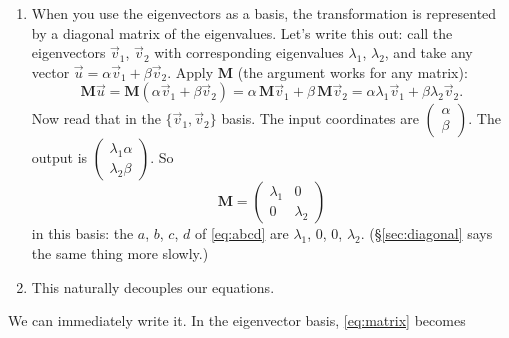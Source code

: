 \documentclass[12pt]{article}
\numberwithin{equation}{section}
\begin{document}
\begin{enumerate}
\item[1.] When you use the eigenvectors as a basis, the transformation is
  represented by a diagonal matrix of the eigenvalues. Let's write this
  out: call the eigenvectors $\vec{v}_1$, $\vec{v}_2$ with corresponding
  eigenvalues $\lambda_1$, $\lambda_2$, and take any vector $\vec{u} =
  \alpha\vec{v}_1 + \beta\vec{v}_2$. Apply $\mathbf{M}$ (the argument
  works for any matrix):
  \begin{equation*}
    \mathbf{M}\vec{u} = \mathbf{M}(\alpha\vec{v}_1 + \beta\vec{v}_2)
    = \alpha\,\mathbf{M}\vec{v}_1 + \beta\,\mathbf{M}\vec{v}_2
    = \alpha\lambda_1\vec{v}_1 + \beta\lambda_2\vec{v}_2 .
  \end{equation*}
  Now read that in the $\{\vec{v}_1, \vec{v}_2\}$ basis. The input coordinates
  are $\left(\begin{smallmatrix} \alpha \\ \beta \end{smallmatrix}\right)$. The
  output is $\left(\begin{smallmatrix} \lambda_1 \alpha \\ \lambda_2 \beta
  \end{smallmatrix}\right)$. So
  \begin{equation*}
    \mathbf{M} = \begin{pmatrix} \lambda_1 & 0 \\ 0 & \lambda_2 \end{pmatrix}
  \end{equation*}
  in this basis: the $a$, $b$, $c$, $d$ of \eqref{eq:abcd} are $\lambda_1$,
  $0$, $0$, $\lambda_2$. (\S\ref{sec:diagonal} says the same thing more
  slowly.)
\item[2.] This naturally decouples our equations.
\end{enumerate}

\noindent We can immediately write it. In the eigenvector basis,
\eqref{eq:matrix} becomes
\end{document}
